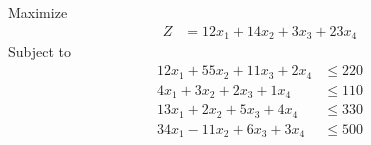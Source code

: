 \documentclass[12pt]{article}
\begin{document}
\subsection{}
Maximize
\begin{align*}
Z                              & = 12x_{1}+14x_{2}+3x_{3}+23x_{4}
\end{align*}
Subject to
\begin{align*}
12x_{1}+55x_{2}+11x_{3}+2x_{4} & \le 220                                                                                                                                                                                                \\
4x_{1}+3x_{2}+2x_{3}+1x_{4}    & \le 110                                                                                                                                                                                                \\
13x_{1}+2x_{2}+5x_{3}+4x_{4}   & \le 330                                                                                                                                                                                                \\
34x_{1}-11x_{2}+6x_{3}+3x_{4}  & \le 500                                                                                                                                                                                                \\
\end{align*}
\end{document}
